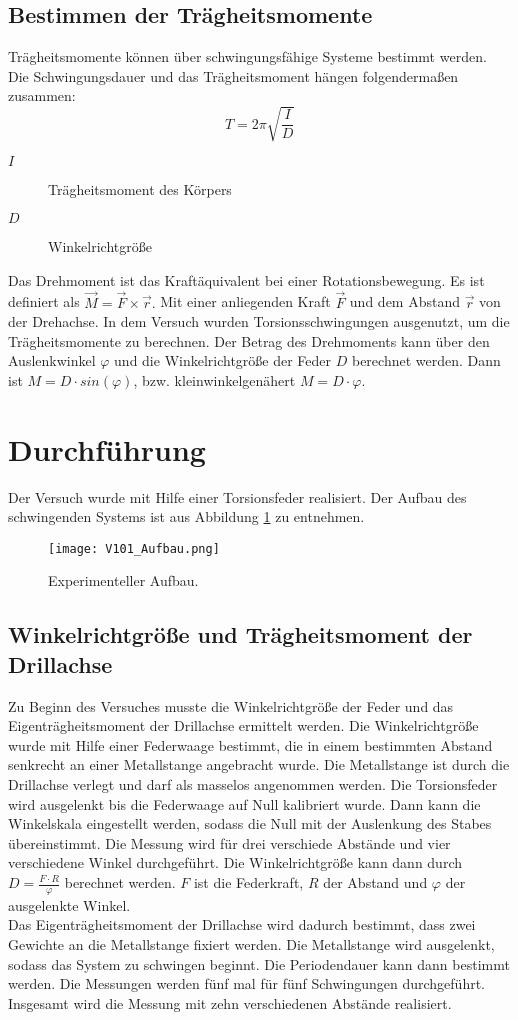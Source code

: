 \subsection{Bestimmen der Trägheitsmomente}
Trägheitsmomente können über schwingungsfähige Systeme bestimmt werden. Die Schwingungsdauer und das Trägheitsmoment hängen folgendermaßen zusammen:
\begin{equation}
  T = 2\pi \sqrt{\frac{I}{D}}
\end{equation}
\begin{description}
  \item[$I$]Trägheitsmoment des Körpers
  \item[$D$]Winkelrichtgröße
\end{description}
Das Drehmoment ist das Kraftäquivalent bei einer Rotationsbewegung. Es ist definiert als $\vec{M} = \vec{F} \times \vec{r}.$ Mit einer anliegenden Kraft $\vec{F}$ und dem Abstand $\vec{r}$ von der Drehachse.
In dem Versuch wurden Torsionsschwingungen ausgenutzt, um die Trägheitsmomente zu berechnen. Der Betrag des Drehmoments kann über den Auslenkwinkel $\varphi$ und die Winkelrichtgröße der Feder $D$ berechnet werden. Dann ist $M = D\cdot sin(\varphi)$, bzw. kleinwinkelgenähert $M = D\cdot\varphi$.
\section{Durchführung}
Der Versuch wurde mit Hilfe einer Torsionsfeder realisiert. Der Aufbau des schwingenden Systems ist aus Abbildung \ref{fig:Aufbau} zu entnehmen.
\begin{figure}
  \centering
  \texttt{[image: V101\_Aufbau.png]}
  \caption{Experimenteller Aufbau.\cite{anleitung01}}
  \label{fig:Aufbau}
\end{figure}
\FloatBarrier
\subsection{Winkelrichtgröße und Trägheitsmoment der Drillachse}
Zu Beginn des Versuches musste die Winkelrichtgröße der Feder und das Eigenträgheitsmoment der Drillachse ermittelt werden. Die Winkelrichtgröße wurde mit Hilfe einer Federwaage bestimmt,
die in einem bestimmten Abstand senkrecht an einer Metallstange angebracht wurde. Die Metallstange ist durch die Drillachse verlegt und darf als masselos angenommen werden. Die Torsionsfeder
wird ausgelenkt bis die Federwaage auf Null kalibriert wurde. Dann kann die Winkelskala eingestellt werden, sodass die Null mit der Auslenkung des Stabes übereinstimmt. Die Messung wird für
drei verschiede Abstände und vier verschiedene Winkel durchgeführt. Die Winkelrichtgröße kann dann durch $D = \frac{F\cdot R}{\varphi}$ berechnet werden. $F$ ist die Federkraft, $R$ der
Abstand und $\varphi$ der ausgelenkte Winkel.\\
Das Eigenträgheitsmoment der Drillachse wird dadurch bestimmt, dass zwei Gewichte an die Metallstange fixiert werden. Die Metallstange wird ausgelenkt, sodass das System zu schwingen beginnt.
Die Periodendauer kann dann bestimmt werden. Die Messungen werden fünf mal für fünf Schwingungen durchgeführt. Insgesamt wird die Messung mit zehn verschiedenen Abstände realisiert.
